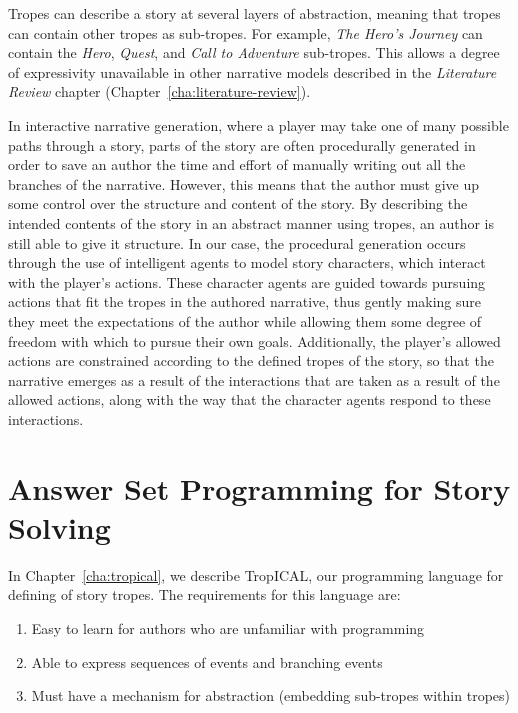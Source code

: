 \documentclass[11pt]{report}
\begin{document}
Tropes can describe a story at several layers of abstraction, meaning that
tropes can contain other tropes as sub-tropes. For example, \emph{The Hero's
  Journey} can contain the \emph{Hero}, \emph{Quest}, and \emph{Call to
  Adventure} sub-tropes. This allows a degree of expressivity unavailable in
other narrative models described in the \emph{Literature Review} chapter (Chapter~\ref{cha:literature-review}).

In interactive narrative generation, where a player may take one of many
possible paths through a story, parts of the story are often procedurally
generated in order to save an author the time and effort of manually writing out
all the branches of the narrative. However, this means that the author must give
up some control over the structure and content of the story. By describing the
intended contents of the story in an abstract manner using tropes, an author is
still able to give it structure. In our case, the procedural generation occurs
through the use of intelligent agents to model story characters, which interact
with the player's actions. These character
agents are guided towards pursuing actions that fit the tropes in the authored
narrative, thus gently making sure they meet the expectations of the author
while allowing them some degree of freedom with which to pursue their own goals.
Additionally, the player's allowed actions are constrained according to the
defined tropes of the story, so that the narrative emerges as a result of the
interactions that are taken as a result of the allowed actions, along with the
way that the character agents respond to these interactions.

\section{Answer Set Programming for Story Solving}
\label{sec:trope-interface}
In Chapter~\ref{cha:tropical}, we describe TropICAL, our programming language
for defining of story tropes. The requirements for this language are:

\begin{enumerate}
\item Easy to learn for authors who are unfamiliar with programming\label{req1}
  \item Able to express sequences of events and branching events\label{req2}
  \item Must have a mechanism for abstraction (embedding sub-tropes within tropes)\label{req3}
\end{enumerate}
\end{document}
